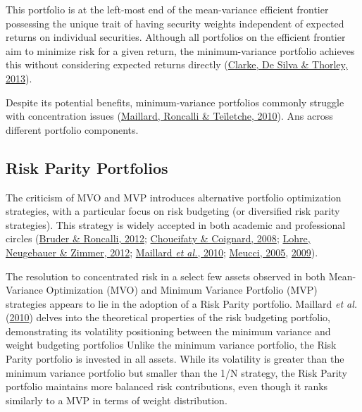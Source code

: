 \documentclass[12pt,preprint, authoryear]{elsarticle}
\numberwithin{equation}{section}
\numberwithin{figure}{section}
\numberwithin{table}{section}
\begin{document}
This portfolio is at the left-most end of the mean-variance efficient
frontier possessing the unique trait of having security weights
independent of expected returns on individual securities. Although all
portfolios on the efficient frontier aim to minimize risk for a given
return, the minimum-variance portfolio achieves this without considering
expected returns directly
(\protect\hyperlink{ref-clarke2013risk}{Clarke, De Silva \& Thorley,
2013}).

Despite its potential benefits, minimum-variance portfolios commonly
struggle with concentration issues
(\protect\hyperlink{ref-maillard2010properties}{Maillard, Roncalli \&
Teïletche, 2010}). Ans across different portfolio components.

\hypertarget{risk-parity-portfolios}{%
\subsection{Risk Parity Portfolios}\label{risk-parity-portfolios}}

The criticism of MVO and MVP introduces alternative portfolio
optimization strategies, with a particular focus on risk budgeting (or
diversified risk parity strategies). This strategy is widely accepted in
both academic and professional circles
(\protect\hyperlink{ref-bruder2012managing}{Bruder \& Roncalli, 2012};
\protect\hyperlink{ref-choueifaty2008toward}{Choueifaty \& Coignard,
2008}; \protect\hyperlink{ref-lohre2012diversified}{Lohre, Neugebauer \&
Zimmer, 2012}; \protect\hyperlink{ref-maillard2010properties}{Maillard
\emph{et al.}, 2010}; \protect\hyperlink{ref-meucci2005risk}{Meucci,
2005}, \protect\hyperlink{ref-meucci2009managing}{2009}).

The resolution to concentrated risk in a select few assets observed in
both Mean-Variance Optimization (MVO) and Minimum Variance Portfolio
(MVP) strategies appears to lie in the adoption of a Risk Parity
portfolio. Maillard \emph{et al.}
(\protect\hyperlink{ref-maillard2010properties}{2010}) delves into the
theoretical properties of the risk budgeting portfolio, demonstrating
its volatility positioning between the minimum variance and weight
budgeting portfolios Unlike the minimum variance portfolio, the Risk
Parity portfolio is invested in all assets. While its volatility is
greater than the minimum variance portfolio but smaller than the 1/N
strategy, the Risk Parity portfolio maintains more balanced risk
contributions, even though it ranks similarly to a MVP in terms of
weight distribution.
\end{document}
